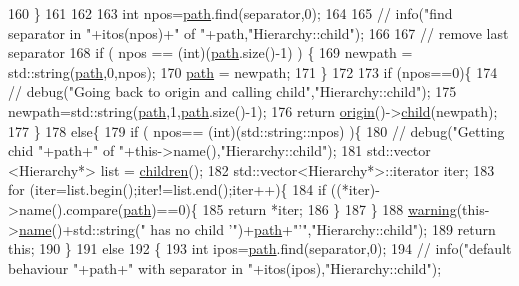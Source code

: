 \begin{DoxyCode}
160   \}
161 
162 
163   \textcolor{keywordtype}{int} npos=\hyperlink{classHierarchy_aa7990fa7caf132d83e361ce033c6c65a}{path}.find(separator,0);
164 
165   \textcolor{comment}{//  info("find separator in "+itos(npos)+" of "+path,"Hierarchy::child");}
166 
167   \textcolor{comment}{// remove last separator}
168   \textcolor{keywordflow}{if} ( npos == (\textcolor{keywordtype}{int})(\hyperlink{classHierarchy_aa7990fa7caf132d83e361ce033c6c65a}{path}.size()-1) ) \{
169     newpath = std::string(\hyperlink{classHierarchy_aa7990fa7caf132d83e361ce033c6c65a}{path},0,npos);
170     \hyperlink{classHierarchy_aa7990fa7caf132d83e361ce033c6c65a}{path} = newpath;
171   \}
172 
173   \textcolor{keywordflow}{if} (npos==0)\{
174     \textcolor{comment}{//    debug("Going back to origin and calling child","Hierarchy::child");}
175     newpath=std::string(\hyperlink{classHierarchy_aa7990fa7caf132d83e361ce033c6c65a}{path},1,\hyperlink{classHierarchy_aa7990fa7caf132d83e361ce033c6c65a}{path}.size()-1);
176     \textcolor{keywordflow}{return} \hyperlink{classHierarchy_aee461dc930ce3871636ff87f075b1b83}{origin}()->\hyperlink{classHierarchy_a1e207f973c694b538bf90107b4868817}{child}(newpath);
177   \}
178   \textcolor{keywordflow}{else}\{
179     \textcolor{keywordflow}{if} ( npos== (\textcolor{keywordtype}{int})(std::string::npos) )\{
180       \textcolor{comment}{//      debug("Getting chid "+path+" of "+this->name(),"Hierarchy::child");}
181       std::vector <Hierarchy*> list = \hyperlink{classHierarchy_aa9a76f69e98e052ee1a6e32cea006288}{children}();
182       std::vector<Hierarchy*>::iterator iter;
183       \textcolor{keywordflow}{for} (iter=list.begin();iter!=list.end();iter++)\{
184         \textcolor{keywordflow}{if} ((*iter)->name().compare(\hyperlink{classHierarchy_aa7990fa7caf132d83e361ce033c6c65a}{path})==0)\{
185           \textcolor{keywordflow}{return} *iter;
186         \}
187       \}
188       \hyperlink{classObject_a65cd4fda577711660821fd2cd5a3b4c9}{warning}(this->\hyperlink{classObject_a300f4c05dd468c7bb8b3c968868443c1}{name}()+std::string(\textcolor{stringliteral}{" has no child '"})+\hyperlink{classHierarchy_aa7990fa7caf132d83e361ce033c6c65a}{path}+\textcolor{stringliteral}{"'"},\textcolor{stringliteral}{"Hierarchy::child"});
189       \textcolor{keywordflow}{return} \textcolor{keyword}{this};
190     \}
191     \textcolor{keywordflow}{else}
192     \{
193       \textcolor{keywordtype}{int} ipos=\hyperlink{classHierarchy_aa7990fa7caf132d83e361ce033c6c65a}{path}.find(separator,0);
194       \textcolor{comment}{//      info("default behaviour "+path+" with separator in "+itos(ipos),"Hierarchy::child");}

\end{DoxyCode}
